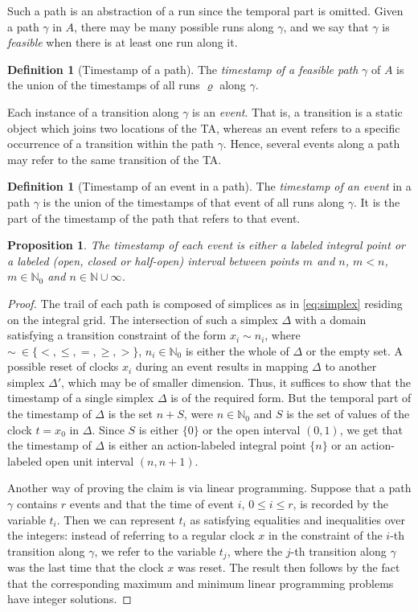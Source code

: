 \documentclass[11pt]{amsart}
\newtheorem{proposition}[theorem]{Proposition}
\theoremstyle{definition}
\newtheorem{definition}[theorem]{Definition}
\newcommand{\Naturals}{\mathbb{N}}
\newcommand{\ZNaturals}{\mathbb{N}_0}
\begin{document}
Such a path is an abstraction of a run since the temporal part is omitted.
Given a path $\gamma$ in $A$, there may be many possible runs along $\gamma$, and we say that $\gamma$ is \emph{feasible} when there is at least one run along it.
\begin{definition}[Timestamp of a path]
	The \emph{timestamp of a feasible path} $\gamma$ of $A$ is the union of the timestamps of all runs $\varrho$ along $\gamma$.
\end{definition}
Each instance of a transition along $\gamma$ is an \emph{event}.
That is, a transition is a static object which joins two locations of the TA, whereas an event refers to a specific occurrence of a transition within the path $\gamma$.
Hence, several events along a path may refer to the same transition of the TA.
\begin{definition}[Timestamp of an event in a path]
	The \emph{timestamp of an event} in a path $\gamma$ is the union of the timestamps of that event of all runs along $\gamma$.
	It is the part of the timestamp of the path that refers to that event.
\end{definition}
\begin{proposition}
\label{pr:mult_ev_timestamp}
The timestamp of each event is either a labeled integral point or a labeled (open, closed or half-open) interval between points $m$ and $n$, $m < n$, $m \in \ZNaturals$ and $n \in \Naturals \cup \infty$.
\end{proposition}
\begin{proof} 
	The trail of each path is composed of simplices as in \eqref{eq:simplex} residing on the integral grid.
	The intersection of such a simplex $\Delta$ with a domain satisfying a transition constraint of the form $x_i \sim n_i$, where $\sim \ \in \{<,\leq, =,\geq, >\}$, $n_i \in \ZNaturals$ is either the whole of $\Delta$ or the empty set.
	A possible reset of clocks $x_i$ during an event results in mapping $\Delta$ to another simplex $\Delta'$, which may be of smaller dimension.
	Thus, it suffices to show that the timestamp of a single simplex $\Delta$ is of the required form.
	But the temporal part of the timestamp of $\Delta$ is the set $n + S$, were $n \in \ZNaturals$ and $S$ is the set of values of the clock $t=x_0$ in $\Delta$.
	Since $S$ is either $\{0\}$ or the open interval $(0,1)$, we get that the timestamp of $\Delta$ is either an action-labeled integral point $\{n\}$ or an action-labeled open unit interval $(n,n+1)$.

	Another way of proving the claim is via linear programming.
	Suppose that a path $\gamma$ contains $r$ events and that the time of event $i$, $0\leq i \leq r$, is recorded by the variable $t_i$. Then we can represent $t_i$ as satisfying equalities and inequalities over the integers: instead of referring to a regular clock $x$ in the constraint of the $i$-th transition along $\gamma$, we refer to the variable $t_j$, where the $j$-th transition along $\gamma$ was the last time that the clock $x$ was reset. The result then follows by the fact that the corresponding maximum and minimum linear programming problems have integer solutions.	
\end{proof}	
\end{document}

